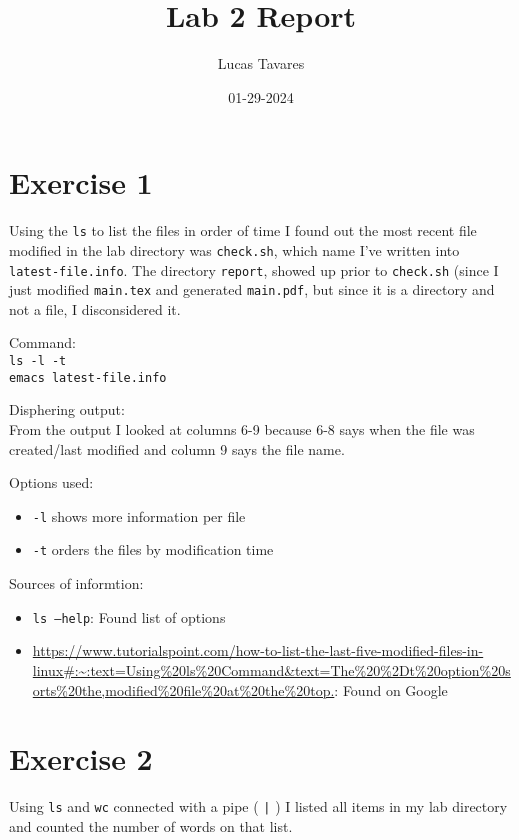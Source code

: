 \documentclass{article}
\title{Lab 2 Report}
\date{01-29-2024}
\author{Lucas Tavares}
\begin{document}
\maketitle
\newpage

\section{Exercise 1}
Using the \texttt{ls} to list the files in order of time I found out the most recent file modified in the lab directory was \texttt{check.sh}, which name I've written into \texttt{latest-file.info}. The directory \texttt{report}, showed up prior to \texttt{check.sh} (since I just modified \texttt{main.tex} and generated \texttt{main.pdf}, but since it is a directory and not a file, I disconsidered it.


Command:\\
\texttt{ls -l -t}\\
\texttt{emacs latest-file.info}

Disphering output:\\
From the output I looked at columns 6-9 because 6-8 says when the file was created/last modified and column 9 says the file name.

Options used:
\begin{itemize}
    \item{\texttt{-l} shows more information per file}
    \item{\texttt{-t} orders the files by modification time}
\end{itemize}

Sources of informtion:
\begin{itemize}
    \item{\texttt{ls --help}: Found list of options}
    \item{\url{https://www.tutorialspoint.com/how-to-list-the-last-five-modified-files-in-linux#:~:text=Using%20ls%20Command&text=The%20%2Dt%20option%20sorts%20the,modified%20file%20at%20the%20top.}: Found on Google}
\end{itemize}

\newpage
\section{Exercise 2}
Using \texttt{ls} and \texttt{wc} connected with a pipe ( \texttt{|} ) I listed all items in my lab directory and counted the number of words on that list.
\end{document}
